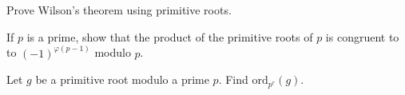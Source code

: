 \documentclass{subfile}
\begin{document}
	
	\begin{problem}
		Prove Wilson's theorem using primitive roots.
	\end{problem}
	
	
	\begin{problem}
		If $p$ is a prime, show that the product of the primitive roots of $p$ is congruent to to $(-1)^{\varphi(p-1)}$ modulo $p$. %
	\end{problem}
	
	
	\begin{problem}
		Let $g$ be a primitive root modulo a prime $p$. Find $\text{ord}_{p^r}(g)$. %
	\end{problem}
	
	
\end{document}
